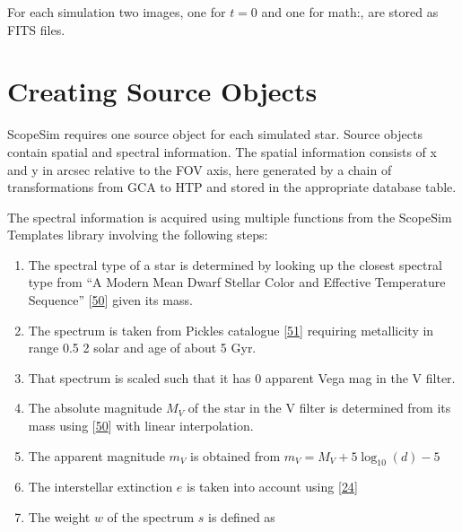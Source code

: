 \documentclass[letterpaper,10pt,english]{sphinxmanual}
\begin{document}
\sphinxAtStartPar
For each simulation two images, one for \(t=0\) and one for math:, are stored as FITS files.


\section{Creating Source Objects}
\label{\detokenize{NBodySimulation/MockObservations:creating-source-objects}}
\sphinxAtStartPar
ScopeSim requires one source object for each simulated star. Source objects contain spatial and spectral information.
The spatial information consists of x and y in arcsec relative to the FOV axis, here generated by a chain of transformations from GCA to HTP and stored in the appropriate database table.

\sphinxAtStartPar
The spectral information is acquired using multiple functions from the ScopeSim Templates library involving the following steps:
\begin{enumerate}
%
\item {} 
\sphinxAtStartPar
The spectral type of a star is determined by looking up the closest spectral type from “A Modern Mean Dwarf Stellar Color and Effective Temperature Sequence” {[}\hyperlink{cite.NBodySimulation/Appendix:id51}{50}{]} given its mass.

\item {} 
\sphinxAtStartPar
The spectrum is taken from Pickles catalogue {[}\hyperlink{cite.NBodySimulation/Appendix:id52}{51}{]} requiring metallicity in range 0.5 \sphinxhyphen{} 2 solar and age of about 5 Gyr.

\item {} 
\sphinxAtStartPar
That spectrum is scaled such that it has 0 apparent Vega mag in the V filter.

\item {} 
\sphinxAtStartPar
The absolute magnitude \(M_V\) of the star in the V filter is determined from its mass using {[}\hyperlink{cite.NBodySimulation/Appendix:id51}{50}{]} with linear interpolation.

\item {} 
\sphinxAtStartPar
The apparent magnitude \(m_V\) is obtained from \(m_V = M_V + 5\log_{10}\left ( d \right )-5\)

\item {} 
\sphinxAtStartPar
The interstellar extinction \(e\) is taken into account using {[}\hyperlink{cite.NBodySimulation/Appendix:id53}{24}{]}

\item {} 
\sphinxAtStartPar
The weight \(w\) of the spectrum \(s\) is defined as

\end{enumerate}
\end{document}
